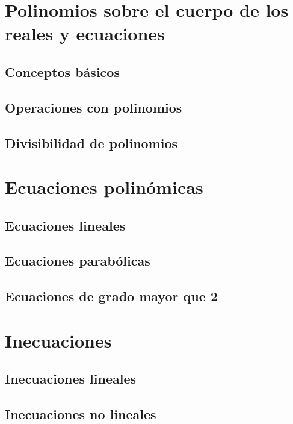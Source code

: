 \chapter{Polinomios sobre el cuerpo de los reales y ecuaciones}

\minitoc

\section{Conceptos básicos}
\section{Operaciones con polinomios}
\section{Divisibilidad de polinomios}

\chapter{Ecuaciones polinómicas}
\minitoc

\section{Ecuaciones lineales}
\section{Ecuaciones parabólicas}
\section{Ecuaciones de grado mayor que 2}

\chapter{Inecuaciones}
\minitoc

\section{Inecuaciones lineales}
\section{Inecuaciones no lineales}


